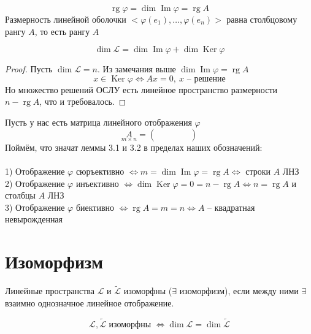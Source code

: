 \documentclass[11pt]{article}
\DeclareMathOperator{\Imm}{Im}
\DeclareMathOperator{\Ker}{Ker}
\DeclareMathOperator{\rg}{rg}
\begin{document}
\begin{remark}
  \[\rg \varphi = \dim \Imm \varphi = \rg A\]
  Размерность линейной оболочки $<\varphi (e_1), \dots, \varphi (e_n)>$ равна 
  столбцовому рангу $A$, то есть рангу $A$
\end{remark}

\begin{theorem}
  \[\dim \mathcal{L} = \dim \Imm \varphi + \dim \Ker \varphi\]
\end{theorem}

\begin{proof}
  Пусть $\dim \mathcal{L} = n$. Из замечания выше $\dim \Imm \varphi = \rg A$
  \[x \in \Ker \varphi \Longleftrightarrow Ax = 0, \ x \text{ -- решение}\]
  Но множество решений ОСЛУ есть линейное пространство размерности $n - \rg A$, что и требовалось.
\end{proof}

\begin{remark}
  Пусть у нас есть матрица линейного отображения $\varphi$
  \[\underset{m \times n}{A} = 
  \begin{pmatrix}
    & & & & \\
    & & & & \\
    & & & &
  \end{pmatrix}
  \]
  Поймём, что значат леммы 3.1 и 3.2 в пределах наших обозначений: \\ \\
  1) Отображение $\varphi$ сюръективно $\Longleftrightarrow m = \dim \Imm \varphi = \rg A \Longleftrightarrow$ строки $A$ ЛНЗ \\
  2) Отображение $\varphi$ инъективно $\Longleftrightarrow \dim \Ker \varphi = 0 = n - \rg A \Longleftrightarrow n = \rg A$ и столбцы $A$ ЛНЗ \\
  3) Отображение $\varphi$ биективно $\Longleftrightarrow \rg A = m = n \Longleftrightarrow A$ -- квадратная невырожденная 
\end{remark}

\section{Изоморфизм}

\begin{definition}
  Линейные пространства $\mathcal{L}$ и $\widetilde{\mathcal{L}}$ изоморфны ($\exists$ изоморфизм), 
  если между ними $\exists$ взаимно однозначное линейное отображение.
\end{definition}

\begin{theorem}
  \[\mathcal{L}, \widetilde{\mathcal{L}} \text{ изоморфны } \Longleftrightarrow \dim \mathcal{L} = \dim \widetilde{\mathcal{L}}\]
\end{theorem}
\end{document}
